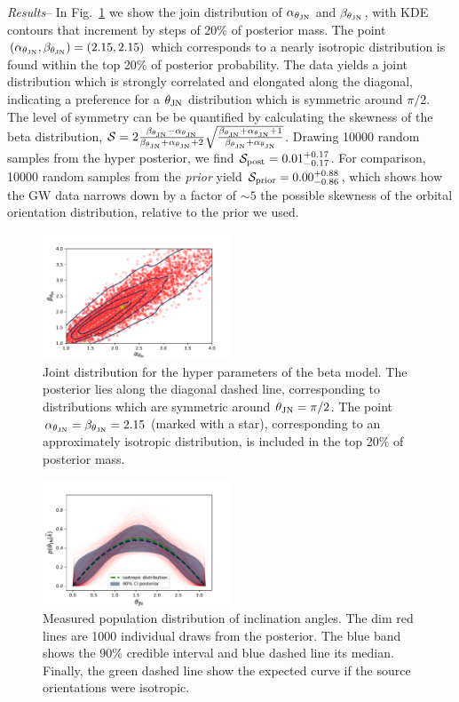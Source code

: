 \documentclass[floats,floatfix,showpacs,amssymb,prl,twocolumn,superscriptaddress,nofootinbib]{revtex4-2}
\newcommand\prlsec[1]{\vspace{2mm}\noindent \emph{#1}--}
\newcommand{\tjn}{\ensuremath{\theta_{\rm{JN}}}\xspace}
\newcommand{\atjn}{\ensuremath{\alpha_{\tjn}}\xspace}
\newcommand{\btjn}{\ensuremath{\beta_{\tjn}}\xspace}
\begin{document}
\prlsec{Results} In Fig.~\ref{fig.betamarg} we show the join distribution of \atjn and \btjn, with KDE contours that increment by steps of 20\% of posterior mass. The point $(\atjn,\btjn) = (2.15,2.15)$ which corresponds to a nearly isotropic distribution is found within the top 20\% of posterior probability. The data yields a joint distribution which is strongly correlated and elongated along the diagonal, indicating a preference for a \tjn distribution which is symmetric around $\pi/2$. The level of symmetry can be be quantified by calculating the skewness of the beta distribution, $\mathcal{S}= 2\frac{\btjn-\atjn}{\btjn+\atjn+2} \sqrt{\frac{\btjn+\atjn+1}{\btjn+\atjn}}$. Drawing 10000 random samples from the hyper posterior, we find $\mathcal{S}_{\rm{post}}=0.01^{+0.17}_{-0.17}$. For comparison, 10000 random samples from the \emph{prior}  yield $\mathcal{S}_{\rm{prior}}=0.00^{+0.88}_{-0.86}$, which shows how the GW data narrows down by a factor of $\sim 5$ the possible skewness of the orbital orientation distribution, relative to the prior we used. 

\begin{figure}[t]
\includegraphics[width=0.5\textwidth]{Figs/BetaMarginalsIFAR1yr}
\caption{Joint distribution for the hyper parameters of the beta model. The posterior lies along the diagonal dashed line, corresponding to distributions which are symmetric around $\tjn=\pi/2$. The point $\atjn=\btjn=2.15$ (marked with a star), corresponding to an approximately isotropic distribution, is included in the top 20\% of posterior mass. }\label{fig.betamarg}
\end{figure}
\begin{figure}[t]
\includegraphics[width=0.5\textwidth]{Figs/BetaPopIFAR1yr}
\caption{Measured population distribution of inclination angles. The dim red lines are 1000 individual draws from the posterior. The blue band shows the 90\% credible interval and blue dashed line its median. Finally, the green dashed line show the expected curve if the source orientations were isotropic. 
}
\label{fig.betapop}
\end{figure}
\end{document}
